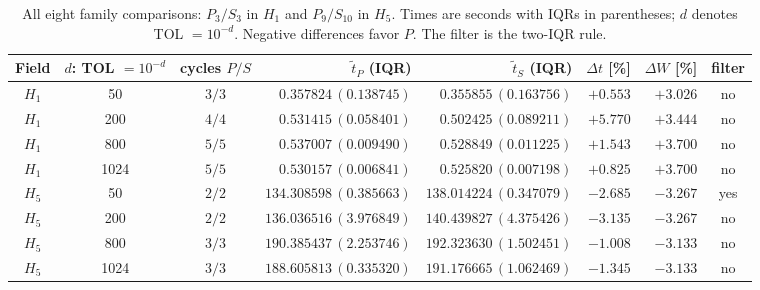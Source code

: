 \begin{table}[htbp]\centering\scriptsize\setlength{\tabcolsep}{3pt}
\caption{All eight family comparisons: $P_3/S_3$ in $H_1$ and $P_9/S_{10}$ in $H_5$. Times are seconds with IQRs in parentheses; $d$ denotes TOL $=10^{-d}$. Negative differences favor $P$. The filter is the two-IQR rule.}\label{tab:mp-summary}
\begin{tabular}{cccrrrrc}\toprule
Field & $d$: TOL $=10^{-d}$ & cycles $P/S$ & $\widetilde t_P$ (IQR) & $\widetilde t_S$ (IQR) & $\Delta t$ [\%] & $\Delta W$ [\%] & filter\\\midrule
$H_{1}$ & 50 & $3/3$ & $0.357824\,(0.138745)$ & $0.355855\,(0.163756)$ & $+0.553$ & $+3.026$ & no\\
$H_{1}$ & 200 & $4/4$ & $0.531415\,(0.058401)$ & $0.502425\,(0.089211)$ & $+5.770$ & $+3.444$ & no\\
$H_{1}$ & 800 & $5/5$ & $0.537007\,(0.009490)$ & $0.528849\,(0.011225)$ & $+1.543$ & $+3.700$ & no\\
$H_{1}$ & 1024 & $5/5$ & $0.530157\,(0.006841)$ & $0.525820\,(0.007198)$ & $+0.825$ & $+3.700$ & no\\
\midrule
$H_{5}$ & 50 & $2/2$ & $134.308598\,(0.385663)$ & $138.014224\,(0.347079)$ & $-2.685$ & $-3.267$ & yes\\
$H_{5}$ & 200 & $2/2$ & $136.036516\,(3.976849)$ & $140.439827\,(4.375426)$ & $-3.135$ & $-3.267$ & no\\
$H_{5}$ & 800 & $3/3$ & $190.385437\,(2.253746)$ & $192.323630\,(1.502451)$ & $-1.008$ & $-3.133$ & no\\
$H_{5}$ & 1024 & $3/3$ & $188.605813\,(0.335320)$ & $191.176665\,(1.062469)$ & $-1.345$ & $-3.133$ & no\\
\bottomrule\end{tabular}\end{table}
